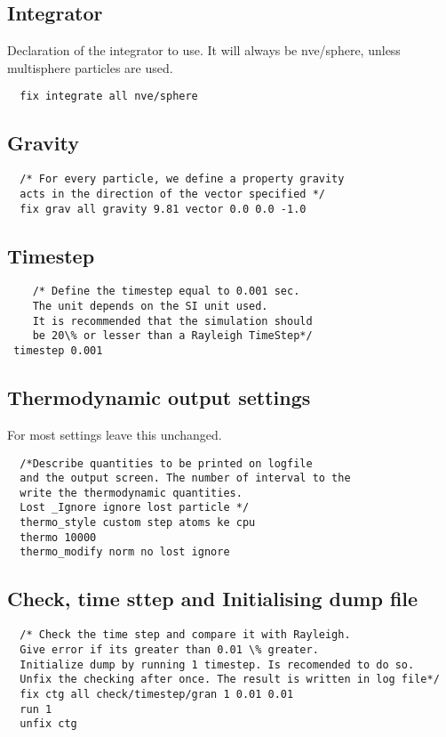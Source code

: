 \documentclass[8pt]{extarticle} %
\begin{document}
\begin{multicols}{3}
\subsection{Integrator}
Declaration of the integrator to use. It will always be nve/sphere, unless multisphere particles are used.
\begin{verbatim}
  fix integrate all nve/sphere
  \end{verbatim}
\subsection{Gravity}
\begin{verbatim}
  /* For every particle, we define a property gravity
  acts in the direction of the vector specified */
  fix grav all gravity 9.81 vector 0.0 0.0 -1.0
  \end{verbatim}
  \subsection{Timestep}

  \begin{verbatim}
    /* Define the timestep equal to 0.001 sec.
    The unit depends on the SI unit used.
    It is recommended that the simulation should
    be 20\% or lesser than a Rayleigh TimeStep*/
 timestep 0.001
  \end{verbatim}

\subsection{Thermodynamic output settings}
For most settings leave this unchanged.
\begin{verbatim}
  /*Describe quantities to be printed on logfile
  and the output screen. The number of interval to the
  write the thermodynamic quantities.
  Lost _Ignore ignore lost particle */
  thermo_style custom step atoms ke cpu
  thermo 10000
  thermo_modify norm no lost ignore
  \end{verbatim}
\subsection{Check, time sttep and Initialising dump file}
\begin{verbatim}
  /* Check the time step and compare it with Rayleigh.
  Give error if its greater than 0.01 \% greater.
  Initialize dump by running 1 timestep. Is recomended to do so.
  Unfix the checking after once. The result is written in log file*/
  fix ctg all check/timestep/gran 1 0.01 0.01
  run 1
  unfix ctg
  \end{verbatim}

\end{multicols}
\end{document}
